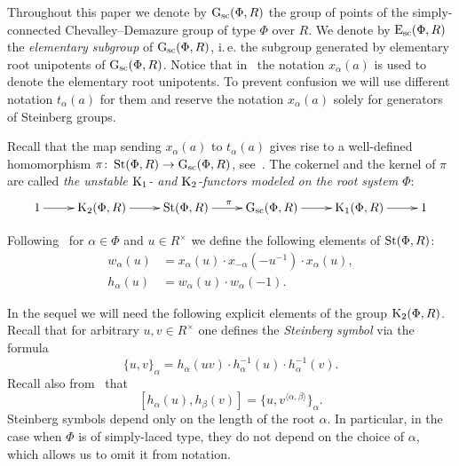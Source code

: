 Throughout this paper we denote by $\operatorname{G}_\mathrm{sc}(\Phi, R)$ the group of points of the simply-connected Chevalley--Demazure group of type $\Phi$ over $R$.
We denote by $\operatorname{E}_\mathrm{sc}(\Phi, R)$ the \textit{elementary subgroup} of $\operatorname{G}_\mathrm{sc}(\Phi, R)$, i.\,e. the subgroup generated by elementary root unipotents of $\operatorname{G}_\mathrm{sc}(\Phi, R)$.
Notice that in~\cite{VP, Vav09} the notation $x_\alpha(a)$ is used to denote the elementary root unipotents.
To prevent confusion we will use different notation $t_\alpha(a)$ for them and reserve the notation $x_\alpha(a)$ solely for generators of Steinberg groups.

Recall that the map sending $x_\alpha(a)$ to $t_\alpha(a)$ gives rise to a well-defined homomorphism $\pi \colon \operatorname{St}(\Phi, R) \to \operatorname{G}_\mathrm{sc}(\Phi, R)$, see~\cite[\S~1A]{St78}.
The cokernel and the kernel of $\pi$ are called \textit{the unstable $\operatorname{K}_1$- and $\operatorname{K}_2$-functors modeled on the root system $\Phi$}:
\begin{equation} \label{eq:K1-K2-sequence}
  \xymatrix{ 1 \ar[r] & \K_2(\Phi, R) \ar[r] & \St(\Phi, R) \ar[r]^{\pi} & \Gsc(\Phi, R) \ar[r] & \K_1(\Phi, R) \ar[r] & 1}
\end{equation}

Following~\cite{Ma69} for $\alpha\in\Phi$ and $u \in R^\times$ we define the following elements of $\operatorname{St}(\Phi, R)$:
\begin{align*} w_\alpha(u) & =  x_\alpha(u) \cdot x_{-\alpha}(-u^{-1}) \cdot x_\alpha(u), \\
               h_\alpha(u) & =  w_\alpha(u) \cdot w_\alpha(-1).  \end{align*}

In the sequel we will need the following explicit elements of the group $\operatorname{K}_2(\Phi, R)$.
Recall that for arbitrary $u, v \in R^\times$ one defines the \textit{Steinberg symbol} via the formula
\begin{equation} \label{eq:steinberg} \{ u, v \}_\alpha = h_\alpha(uv) \cdot h_\alpha^{-1}(u) \cdot h_\alpha^{-1}(v). \end{equation}
Recall also from~\cite[Lemme~5.4]{Ma69} that
\begin{equation} \label{eq:steinberg-2} [h_\alpha(u), h_\beta(v)] = \{u, v^{\langle \alpha, \beta \rangle}\}_\alpha. \end{equation}
Steinberg symbols depend only on the length of the root $\alpha$.
In particular, in the case when $\Phi$ is of simply-laced type, they do not depend on the choice of $\alpha$, which allows us to omit it from notation.

